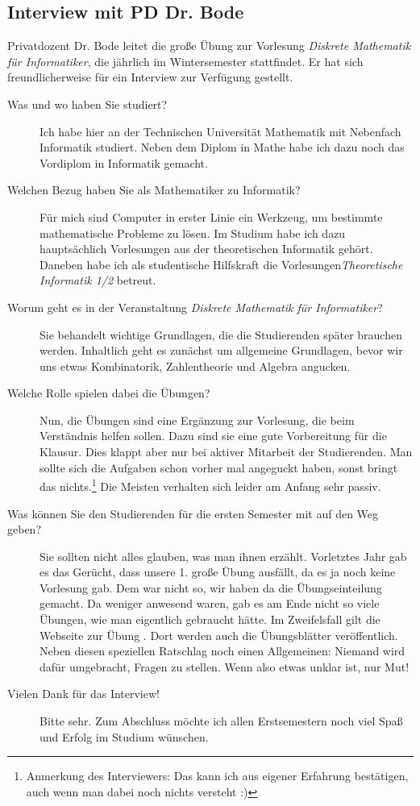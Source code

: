 
\subsection{Interview mit PD Dr. Bode}
	Privatdozent Dr. Bode leitet die große Übung zur Vorlesung \emph{Diskrete Mathematik für Informatiker}, die jährlich im Wintersemester stattfindet. Er hat sich freundlicherweise für ein Interview zur Verfügung gestellt.
	\begin{description}
		\item[Was und wo haben Sie studiert?] 

		Ich habe hier an der Technischen Universität Mathematik mit Nebenfach Informatik studiert. Neben dem Diplom in Mathe habe ich dazu noch das Vordiplom in Informatik gemacht.
		\item[Welchen Bezug haben Sie als Mathematiker zu Informatik?] 

		Für mich sind Computer in erster Linie ein Werkzeug, um bestimmte mathematische Probleme zu lösen. Im Studium habe ich dazu hauptsächlich Vorlesungen aus der theoretischen Informatik gehört. Daneben habe ich als studentische Hilfskraft die Vorlesungen\emph{Theoretische Informatik 1/2} betreut.
		\item[Worum geht es in der Veranstaltung \emph{Diskrete Mathematik für Informatiker}?] 

		Sie behandelt wichtige Grundlagen, die die Studierenden später brauchen werden. Inhaltlich geht es zunächst um allgemeine Grundlagen, bevor wir uns etwas Kombinatorik, Zahlentheorie und Algebra angucken.
		\item[Welche Rolle spielen dabei die Übungen?] 

		Nun, die Übungen sind eine Ergänzung zur Vorlesung, die beim Verständnis helfen sollen. Dazu sind sie eine gute Vorbereitung für die Klausur. Dies klappt aber nur bei aktiver Mitarbeit der Studierenden. Man sollte sich die Aufgaben schon vorher mal angeguckt haben, sonst bringt das nichts.\footnote{Anmerkung des Interviewers: Das kann ich aus eigener Erfahrung bestätigen, auch wenn man dabei noch nichts versteht :)} Die Meisten verhalten sich leider am Anfang sehr passiv.
		\item[Was können Sie den Studierenden für die ersten Semester mit auf den Weg geben?] 

		Sie sollten  nicht alles glauben, was man ihnen erzählt. Vorletztes Jahr gab es das Gerücht, dass unsere 1. große Übung ausfällt, da es ja noch keine Vorlesung gab. Dem war nicht so, wir haben da die Übungseinteilung gemacht. Da weniger anwesend waren, gab es am Ende nicht so viele Übungen, wie man eigentlich gebraucht hätte. Im Zweifelsfall gilt die Webseite zur Übung . Dort werden auch die Übungsblätter veröffentlich.\\ Neben diesen speziellen Ratschlag noch einen Allgemeinen: Niemand wird dafür umgebracht, Fragen zu stellen. Wenn also etwas unklar ist, nur Mut!
		\item[Vielen Dank für das Interview!] 

		Bitte sehr. Zum Abschluss möchte ich allen Erstsemestern noch viel Spaß und Erfolg im Studium wünschen.
	\end{description}
